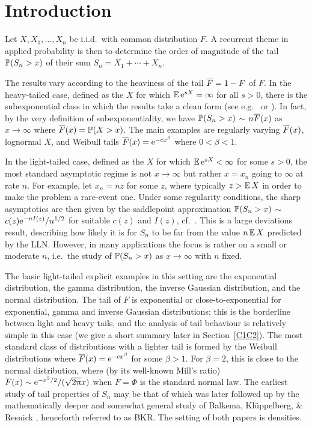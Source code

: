 \section{Introduction}\label{S:Intr}

Let $X,X_1,\ldots,X_n$ be i.i.d.\ with common distribution $F$. A recurrent theme in applied probability is then
to determine the order of magnitude of the tail $\operatorname{{\mathbb P}}(S_n>x)$ of their sum $S_n=X_1+\cdots+X_n$.

The results vary according to the heaviness  of the tail $\overline F=1-F$ of $F$. In the heavy-tailed case, defined as the $X$ for which $\operatorname{{\mathbb E}}\mathrm{e}^{sX}=\infty$ for all $s>0$, there is the subexponential class in which the results take a clean form (see e.g.\ \cite{embrechts2013modelling} or \cite{asmussen2010ruin}). In fact, by the
very definition of subexponentiality, we have $\operatorname{{\mathbb P}}(S_n>x)$ $\sim$ $n\overline F(x)$ as $x\to\infty$ where $\overline F(x)=\operatorname{{\mathbb P}}(X>x)$. The main examples are regularly varying $\overline F(x)$, lognormal $X$, and Weibull tails $\overline F(x)=\mathrm{e}^{-cx^\beta}$ where $0<\beta<1$.

In the light-tailed case, defined as the $X$ for which $\operatorname{{\mathbb E}}\mathrm{e}^{sX}<\infty$ for some $s>0$, the most standard asymptotic regime is not $x\to\infty$ but rather
$x=x_n$ going to $\infty$ at rate $n$. For example, let $x_n=nz$ for some $z$, where typically $z>\operatorname{{\mathbb E}} X$ in order to make the problem a rare-event one.
Under some regularity conditions, the sharp asymptotics are then given by the saddlepoint approximation $\operatorname{{\mathbb P}}(S_n>x)$ $\sim$
$c(z)\mathrm{e}^{-nI(z)}/n^{1/2}$ for suitable $c(z)$ and $I(z)$, cf.\ \cite{jensen1995saddlepoint}. This is a large deviations result, describing how likely
it is for $S_n$ to be far from the value $n\operatorname{{\mathbb E}} X$ predicted by the LLN. However, in many applications the focus is rather on a small
or moderate $n$, i.e.\ the study of  $\operatorname{{\mathbb P}}(S_n>x)$ as $x\to\infty$ with $n$ fixed.

The basic light-tailed explicit examples in this setting are the exponential distribution, the gamma distribution,
the inverse Gaussian distribution,  and the normal distribution. The tail of $F$ is exponential or close-to-exponential for exponential, gamma and inverse Gaussian distributions; this is the borderline between light and heavy tails, and the analysis of tail behaviour is relatively simple in this case (we give a short summary
later in Section~\ref{C1C2}).
The most standard class of distributions with a lighter tail is formed by the Weibull distributions where
$\overline F(x)=\mathrm{e}^{-cx^\beta}$ for some $\beta>1$. For $\beta=2$, this is close to the normal distribution, where (by its well-known Mill's ratio) $\overline F(x)\sim \mathrm{e}^{-x^2/2}/(\sqrt{2\uppi}x)$ when $F = \Phi$ is the standard normal law. The earliest study of  tail properties of $S_n$ may be that
of \cite{rootzen1987ratio} which was later followed up by the mathematically deeper and somewhat general study of Balkema, Kl\"uppelberg, \& Resnick \cite{balkema1993densities}, henceforth referred to as BKR. The setting of both papers is densities.

